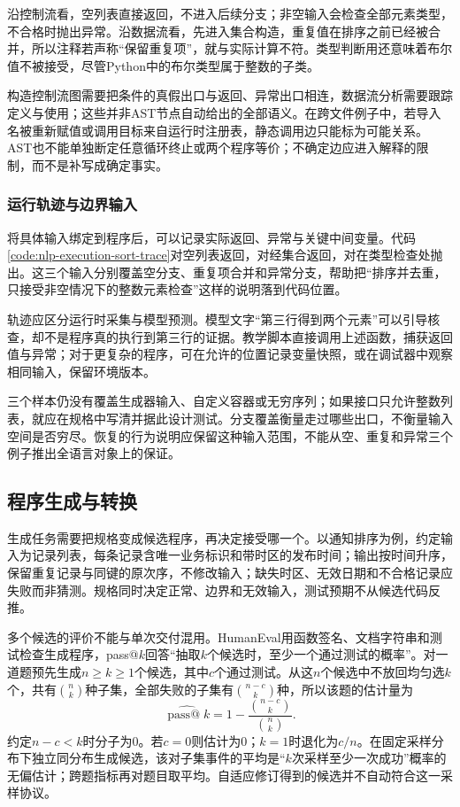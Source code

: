 沿控制流看，空列表直接返回，不进入后续分支；非空输入会检查全部元素类型，不合格时抛出异常。沿数据流看，先进入集合构造，重复值在排序之前已经被合并，所以注释若声称“保留重复项”，就与实际计算不符。类型判断用还意味着布尔值不被接受，尽管Python中的布尔类型属于整数的子类。

构造控制流图需要把条件的真假出口与返回、异常出口相连，数据流分析需要跟踪定义与使用；这些并非AST节点自动给出的全部语义。在跨文件例子中，若导入名被重新赋值或调用目标来自运行时注册表，静态调用边只能标为可能关系。AST也不能单独断定任意循环终止或两个程序等价；不确定边应进入解释的限制，而不是补写成确定事实。

\subsubsection{运行轨迹与边界输入}
\label{sec:nlp-execution-traces}

将具体输入绑定到程序后，可以记录实际返回、异常与关键中间变量。代码\ref{code:nlp-execution-sort-trace}对空列表返回\code{[]}，对\code{[3,1,3]}经集合返回\code{[1,3]}，对\code{[1,"2"]}在类型检查处抛出。这三个输入分别覆盖空分支、重复项合并和异常分支，帮助把“排序并去重，只接受非空情况下的整数元素检查”这样的说明落到代码位置。

轨迹应区分运行时采集与模型预测。模型文字“第三行得到两个元素”可以引导核查，却不是程序真的执行到第三行的证据。教学脚本直接调用上述函数，捕获返回值与异常；对于更复杂的程序，可在允许的位置记录变量快照，或在调试器中观察相同输入，保留环境版本。

三个样本仍没有覆盖生成器输入、自定义容器或无穷序列；如果接口只允许整数列表，就应在规格中写清并据此设计测试。分支覆盖衡量走过哪些出口，不衡量输入空间是否穷尽。恢复的行为说明应保留这种输入范围，不能从空、重复和异常三个例子推出全语言对象上的保证。

\subsection{程序生成与转换}
\label{sec:nlp-execution-generation}

生成任务需要把规格变成候选程序，再决定接受哪一个。以通知排序为例，约定输入为记录列表，每条记录含唯一业务标识和带时区的发布时间；输出按时间升序，保留重复记录与同键的原次序，不修改输入；缺失时区、无效日期和不合格记录应失败而非猜测。规格同时决定正常、边界和无效输入，测试预期不从候选代码反推。

多个候选的评价不能与单次交付混用。HumanEval用函数签名、文档字符串和测试检查生成程序，pass@$k$回答“抽取$k$个候选时，至少一个通过测试的概率”。对一道题预先生成$n\geq k\geq1$个候选，其中$c$个通过测试。从这$n$个候选中不放回均匀选$k$个，共有$\binom nk$种子集，全部失败的子集有$\binom{n-c}{k}$种，所以该题的估计量为
\begin{equation}
 \widehat{\operatorname{pass@}k}
 =1-\frac{\binom{n-c}{k}}{\binom nk}.
 \label{eq:nlp-execution-pass-k}
\end{equation}
约定$n-c<k$时分子为0。若$c=0$则估计为0；$k=1$时退化为$c/n$。在固定采样分布下独立同分布生成候选，该对子集事件的平均是“$k$次采样至少一次成功”概率的无偏估计；跨题指标再对题目取平均。自适应修订得到的候选并不自动符合这一采样协议。

